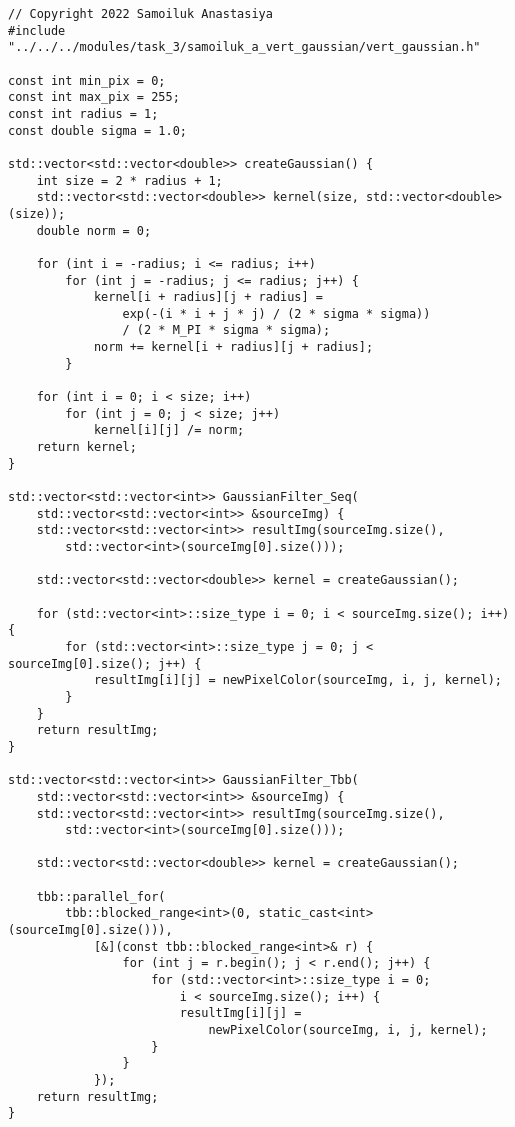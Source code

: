 \documentclass{report}
\begin{document}
\begin{lstlisting}
// Copyright 2022 Samoiluk Anastasiya
#include "../../../modules/task_3/samoiluk_a_vert_gaussian/vert_gaussian.h"

const int min_pix = 0;
const int max_pix = 255;
const int radius = 1;
const double sigma = 1.0;

std::vector<std::vector<double>> createGaussian() {
    int size = 2 * radius + 1;
    std::vector<std::vector<double>> kernel(size, std::vector<double>(size));
    double norm = 0;

    for (int i = -radius; i <= radius; i++)
        for (int j = -radius; j <= radius; j++) {
            kernel[i + radius][j + radius] =
                exp(-(i * i + j * j) / (2 * sigma * sigma))
                / (2 * M_PI * sigma * sigma);
            norm += kernel[i + radius][j + radius];
        }

    for (int i = 0; i < size; i++)
        for (int j = 0; j < size; j++)
            kernel[i][j] /= norm;
    return kernel;
}

std::vector<std::vector<int>> GaussianFilter_Seq(
    std::vector<std::vector<int>> &sourceImg) {
    std::vector<std::vector<int>> resultImg(sourceImg.size(),
        std::vector<int>(sourceImg[0].size()));

    std::vector<std::vector<double>> kernel = createGaussian();

    for (std::vector<int>::size_type i = 0; i < sourceImg.size(); i++) {
        for (std::vector<int>::size_type j = 0; j < sourceImg[0].size(); j++) {
            resultImg[i][j] = newPixelColor(sourceImg, i, j, kernel);
        }
    }
    return resultImg;
}

std::vector<std::vector<int>> GaussianFilter_Tbb(
    std::vector<std::vector<int>> &sourceImg) {
    std::vector<std::vector<int>> resultImg(sourceImg.size(),
        std::vector<int>(sourceImg[0].size()));

    std::vector<std::vector<double>> kernel = createGaussian();

    tbb::parallel_for(
        tbb::blocked_range<int>(0, static_cast<int>(sourceImg[0].size())),
            [&](const tbb::blocked_range<int>& r) {
                for (int j = r.begin(); j < r.end(); j++) {
                    for (std::vector<int>::size_type i = 0;
                        i < sourceImg.size(); i++) {
                        resultImg[i][j] =
                            newPixelColor(sourceImg, i, j, kernel);
                    }
                }
            });
    return resultImg;
}


\end{lstlisting}
\end{document}
